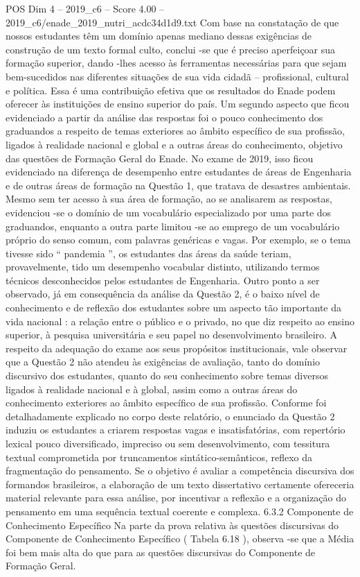 \begin{textsample}{POS Dim 4 – 2019\_c6 – Score 4.00 – 2019\_c6/enade\_2019\_nutri\_acdc34d1d9.txt}
Com base na constatação de que nossos estudantes têm um domínio apenas mediano dessas exigências de construção de um texto formal culto, conclui -se que é preciso aperfeiçoar sua formação superior, dando -lhes acesso às ferramentas necessárias para que sejam bem-sucedidos nas diferentes situações de sua vida cidadã – profissional, cultural e política.
Essa é uma contribuição efetiva que os resultados do Enade podem oferecer às instituições de ensino superior do país.
Um segundo aspecto que ficou evidenciado a partir da análise das respostas foi o pouco conhecimento dos graduandos a respeito de temas exteriores ao âmbito específico de sua profissão, ligados à realidade nacional e global e a outras áreas do conhecimento, objetivo das questões de Formação Geral do Enade.
No exame de 2019, isso ficou evidenciado na diferença de desempenho entre estudantes de áreas de Engenharia e de outras áreas de formação na Questão 1, que tratava de desastres ambientais.
Mesmo sem ter acesso à sua área de formação, ao se analisarem as respostas, evidenciou -se o domínio de um vocabulário especializado por uma parte dos graduandos, enquanto a outra parte limitou -se ao emprego de um vocabulário próprio do senso comum, com palavras genéricas e vagas.
Por exemplo, se o tema tivesse sido “ pandemia ”, os estudantes das áreas da saúde teriam, provavelmente, tido um desempenho vocabular distinto, utilizando termos técnicos desconhecidos pelos estudantes de Engenharia.
Outro ponto a ser observado, já em consequência da análise da Questão 2, é o baixo nível de conhecimento e de reflexão dos estudantes sobre um aspecto tão importante da vida nacional : a relação entre o público e o privado, no que diz respeito ao ensino superior, à pesquisa universitária e seu papel no desenvolvimento brasileiro.
A respeito da adequação do exame aos seus propósitos institucionais, vale observar que a Questão 2 não atendeu às exigências de avaliação, tanto do domínio discursivo dos estudantes, quanto do seu conhecimento sobre temas diversos ligados à realidade nacional e à global, assim como a outras áreas do conhecimento exteriores ao âmbito específico de sua profissão.
Conforme foi detalhadamente explicado no corpo deste relatório, o enunciado da Questão 2 induziu os estudantes a criarem respostas vagas e insatisfatórias, com repertório lexical pouco diversificado, impreciso ou sem desenvolvimento, com tessitura textual comprometida por truncamentos sintático-semânticos, reflexo da fragmentação do pensamento.
Se o objetivo é avaliar a competência discursiva dos formandos brasileiros, a elaboração de um texto dissertativo certamente ofereceria material relevante para essa análise, por incentivar a reflexão e a organização do pensamento em uma sequência textual coerente e complexa. 6.3.2 Componente de Conhecimento Específico Na parte da prova relativa às questões discursivas do Componente de Conhecimento Específico ( Tabela 6.18 ), observa -se que a Média foi bem mais alta do que para as questões discursivas do Componente de Formação Geral.

\end{textsample}
